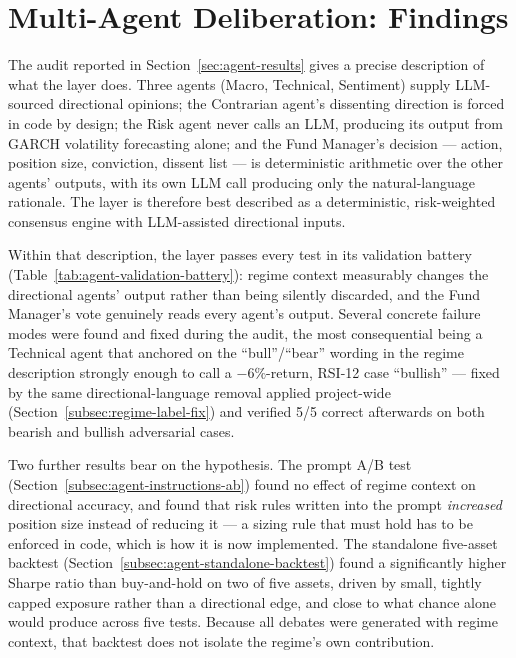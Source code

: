 \section{Multi-Agent Deliberation: Findings}
\label{sec:conclusion-agents}

The audit reported in Section~\ref{sec:agent-results} gives a precise description of what the layer does. Three agents (Macro, Technical, Sentiment) supply LLM-sourced directional opinions; the Contrarian agent's dissenting direction is forced in code by design; the Risk agent never calls an LLM, producing its output from GARCH volatility forecasting alone; and the Fund Manager's decision --- action, position size, conviction, dissent list --- is deterministic arithmetic over the other agents' outputs, with its own LLM call producing only the natural-language rationale. The layer is therefore best described as a deterministic, risk-weighted consensus engine with LLM-assisted directional inputs.

Within that description, the layer passes every test in its validation battery (Table~\ref{tab:agent-validation-battery}): regime context measurably changes the directional agents' output rather than being silently discarded, and the Fund Manager's vote genuinely reads every agent's output. Several concrete failure modes were found and fixed during the audit, the most consequential being a Technical agent that anchored on the ``bull''/``bear'' wording in the regime description strongly enough to call a $-6\%$-return, RSI-12 case ``bullish'' --- fixed by the same directional-language removal applied project-wide (Section~\ref{subsec:regime-label-fix}) and verified 5/5 correct afterwards on both bearish and bullish adversarial cases.

Two further results bear on the hypothesis. The prompt A/B test (Section~\ref{subsec:agent-instructions-ab}) found no effect of regime context on directional accuracy, and found that risk rules written into the prompt \emph{increased} position size instead of reducing it --- a sizing rule that must hold has to be enforced in code, which is how it is now implemented. The standalone five-asset backtest (Section~\ref{subsec:agent-standalone-backtest}) found a significantly higher Sharpe ratio than buy-and-hold on two of five assets, driven by small, tightly capped exposure rather than a directional edge, and close to what chance alone would produce across five tests. Because all debates were generated with regime context, that backtest does not isolate the regime's own contribution.

